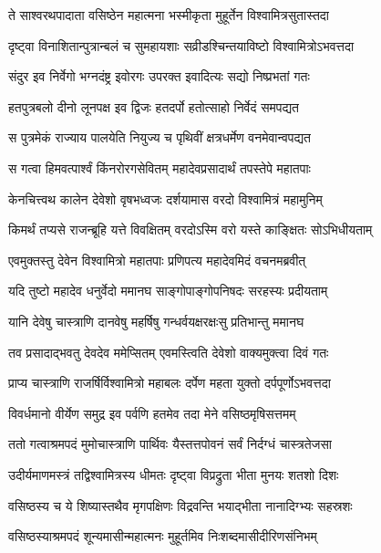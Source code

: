 \twolineshloka
{ते साश्वरथपादाता वसिष्ठेन महात्मना}
{भस्मीकृता मुहूर्तेन विश्वामित्रसुतास्तदा} %

\twolineshloka
{दृष्ट्वा विनाशितान्पुत्रान्बलं च सुमहायशाः}
{सव्रीडश्चिन्तयाविष्टो विश्वामित्रोऽभवत्तदा} %

\twolineshloka
{संदुर इव निर्वेगो भग्नदंष्ट्र इवोरगः}
{उपरक्त इवादित्यः सद्यो निष्प्रभतां गतः} %

\twolineshloka
{हतपुत्रबलो दीनो लूनपक्ष इव द्विजः}
{हतदर्पो हतोत्साहो निर्वेदं समपद्यत} %

\twolineshloka
{स पुत्रमेकं राज्याय पालयेति नियुज्य च}
{पृथिवीं क्षत्रधर्मेण वनमेवान्वपद्यत} %

\twolineshloka
{स गत्वा हिमवत्पार्श्वं किंनरोरगसेवितम्}
{महादेवप्रसादार्थं तपस्तेपे महातपाः} %

\twolineshloka
{केनचित्त्वथ कालेन देवेशो वृषभध्वजः}
{दर्शयामास वरदो विश्वामित्रं महामुनिम्} %

\twolineshloka
{किमर्थं तप्यसे राजन्ब्रूहि यत्ते विवक्षितम्}
{वरदोऽस्मि वरो यस्ते काङ्क्षितः सोऽभिधीयताम्} %

\twolineshloka
{एवमुक्तस्तु देवेन विश्वामित्रो महातपाः}
{प्रणिपत्य महादेवमिदं वचनमब्रवीत्} %

\twolineshloka
{यदि तुष्टो महादेव धनुर्वेदो ममानघ}
{साङ्गोपाङ्गोपनिषदः सरहस्यः प्रदीयताम्} %

\twolineshloka
{यानि देवेषु चास्त्राणि दानवेषु महर्षिषु}
{गन्धर्वयक्षरक्षःसु प्रतिभान्तु ममानघ} %

\twolineshloka
{तव प्रसादाद्भवतु देवदेव ममेप्सितम्}
{एवमस्त्विति देवेशो वाक्यमुक्त्वा दिवं गतः} %

\twolineshloka
{प्राप्य चास्त्राणि राजर्षिर्विश्वामित्रो महाबलः}
{दर्पेण महता युक्तो दर्पपूर्णोऽभवत्तदा} %

\twolineshloka
{विवर्धमानो वीर्येण समुद्र इव पर्वणि}
{हतमेव तदा मेने वसिष्ठमृषिसत्तमम्} %

\twolineshloka
{ततो गत्वाश्रमपदं मुमोचास्त्राणि पार्थिवः}
{यैस्तत्तपोवनं सर्वं निर्दग्धं चास्त्रतेजसा} %

\twolineshloka
{उदीर्यमाणमस्त्रं तद्विश्वामित्रस्य धीमतः}
{दृष्ट्वा विप्रद्रुता भीता मुनयः शतशो दिशः} %

\twolineshloka
{वसिष्ठस्य च ये शिष्यास्तथैव मृगपक्षिणः}
{विद्रवन्ति भयाद्भीता नानादिग्भ्यः सहस्रशः} %

\twolineshloka
{वसिष्ठस्याश्रमपदं शून्यमासीन्महात्मनः}
{मुहूर्तमिव निःशब्दमासीदीरिणसंनिभम्} %


